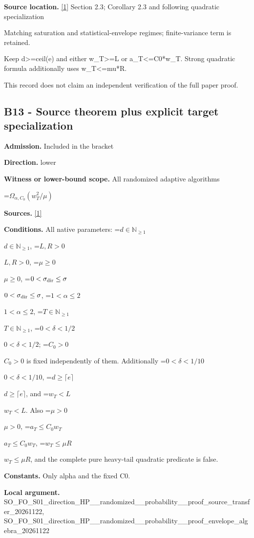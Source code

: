 \documentclass[10pt,a4paper]{article}
\newcommand{\AtlasMath}[1]{\par\begingroup\centering\setbox0=\hbox{$\displaystyle #1$}\ifdim\wd0>1.4\linewidth\typeout{ATLAS WIDE FORMULA: \the\wd0}\fi\ifdim\wd0>\linewidth\resizebox{\linewidth}{!}{\box0}\else\box0\fi\par\endgroup}
\newcommand{\AtlasInlineMath}[1]{\begingroup\setbox0=\hbox{$#1$}\ifdim\wd0>.4\linewidth\endgroup\AtlasMath{#1}\else\endgroup$#1$\fi}
\begin{document}
\textbf{Source location.} \href{https://arxiv.org/html/2610.00260v2}{[1]} Section 2.3; Corollary 2.3 and following quadratic specialization



Matching saturation and statistical-envelope regimes; finite-variance term is retained.



Keep d>=ceil(e) and either w\_T>=L or a\_T<=C0*w\_T. Strong quadratic formula additionally uses w\_T<=mu*R.



This record does not claim an independent verification of the full paper proof.



\subsection{B13 - Source theorem plus explicit target specialization}


\textbf{Admission.} Included in the bracket



\textbf{Direction.} lower



\textbf{Witness or lower-bound scope.} All randomized adaptive algorithms



\AtlasMath{\Omega_{\alpha,C_0}\!\left(w_T^2/\mu\right)}


\textbf{Sources.} \href{https://arxiv.org/html/2610.00260v2}{[1]}



\textbf{Conditions.} All native parameters: \AtlasInlineMath{d\in\mathbb N_{\ge1}}, \AtlasInlineMath{L,R>0}, \AtlasInlineMath{\mu\ge0}, \AtlasInlineMath{0<\sigma_{\rm dir}\le\sigma}, \AtlasInlineMath{1<\alpha\le2}, \AtlasInlineMath{T\in\mathbb N_{\ge1}}, \AtlasInlineMath{0<\delta<1/2}; \AtlasInlineMath{C_0>0} is fixed independently of them. Additionally \AtlasInlineMath{0<\delta<1/10}, \AtlasInlineMath{d\ge\lceil e\rceil}, and \AtlasInlineMath{w_T<L}. Also \AtlasInlineMath{\mu>0}, \AtlasInlineMath{a_T\le C_0w_T}, \AtlasInlineMath{w_T\le\mu R}, and the complete pure heavy-tail quadratic predicate is false.



\textbf{Constants.} Only alpha and the fixed C0.



\textbf{Local argument.} SO\_FO\_S01\_direction\_HP\_\_\allowbreak{}randomized\_\_probability\_\allowbreak{}\_proof\_source\_transfer\_2\allowbreak{}0261122, SO\_FO\_S01\_direction\_HP\_\_\allowbreak{}randomized\_\_probability\_\allowbreak{}\_proof\_envelope\_algebra\_\allowbreak{}20261122
\end{document}
